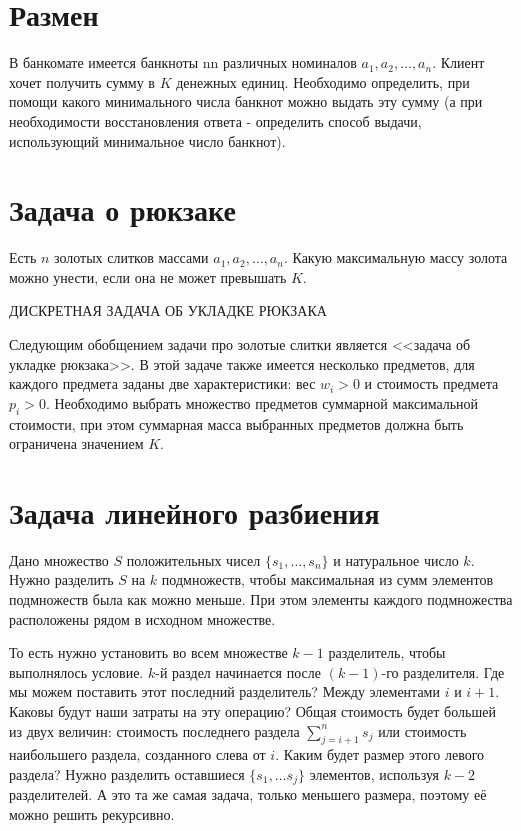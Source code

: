 \documentclass[14pt,openany]{book}
\begin{document}
\section{Размен}

В банкомате имеется банкноты nn различных номиналов $a_1, a_2, \ldots, a_n$. Клиент хочет получить сумму в $K$ денежных единиц. Необходимо определить, при помощи какого минимального числа банкнот можно выдать эту сумму (а при необходимости восстановления ответа - определить способ выдачи, использующий минимальное число банкнот).

\section{Задача о рюкзаке}

Есть $n$ золотых слитков массами $a_1, a_2, \ldots, a_n$. Какую максимальную массу золота можно унести, если она не может превышать $K$.

ДИСКРЕТНАЯ ЗАДАЧА ОБ УКЛАДКЕ РЮКЗАКА

Следующим обобщением задачи про золотые слитки является <<задача об укладке рюкзака>>. В этой задаче также имеется несколько предметов, для каждого предмета заданы две характеристики: вес $w_i > 0$ и стоимость предмета $p_i > 0$. Необходимо выбрать множество предметов суммарной максимальной стоимости, при этом суммарная масса выбранных предметов должна быть ограничена значением $K$.

\section{Задача линейного разбиения}

Дано множество $S$ положительных чисел $\{s_1, \ldots , s_n\}$ и натуральное число $k$.
Нужно разделить $S$ на $k$ подмножеств, чтобы максимальная из сумм элементов подмножеств была 
как можно меньше. При этом элементы каждого подмножества расположены рядом в исходном множестве.

То есть нужно установить во всем множестве $k-1$ разделитель, чтобы выполнялось условие.
$k$-й раздел начинается после $(k-1)$-го разделителя. Где мы можем поставить этот последний
разделитель? Между элементами $i$ и $i+1$. Каковы будут наши затраты на эту операцию?
Общая стоимость будет большей из двух величин: стоимость последнего раздела $\sum_{j=i+1}^{n}s_j$
или стоимость наибольшего раздела, созданного слева от $i$. Каким будет размер этого левого раздела?
Нужно разделить оставшиеся $\{s_1,\ldots s_j\}$ элементов, используя $k-2$ разделителей.
А это та же самая задача, только меньшего размера, поэтому её можно решить рекурсивно.
\end{document}

